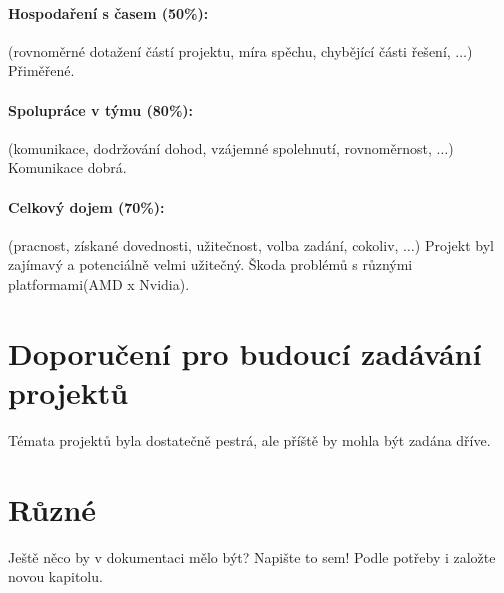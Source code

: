 \documentclass[11pt,a4paper]{article}
\begin{document}
\paragraph{Hospodaření s časem (50\%):} (rovnoměrné dotažení částí projektu,
míra spěchu, chybějící části řešení, $\ldots$)
Přiměřené. 

\paragraph{Spolupráce v týmu (80\%):} (komunikace, dodržování dohod, vzájemné
spolehnutí, rovnoměrnost, $\ldots$)
Komunikace dobrá.

\paragraph{Celkový dojem (70\%):} (pracnost, získané dovednosti, užitečnost,
volba zadání, cokoliv, $\ldots$)
Projekt byl zajímavý a potenciálně velmi užitečný. Škoda problémů s různými platformami(AMD x Nvidia).

\section{Doporučení pro budoucí zadávání projektů}

Témata projektů byla dostatečně pestrá, ale příště by mohla být zadána dříve.

\section{Různé}

Ještě něco by v dokumentaci mělo být? Napište to sem! Podle potřeby i založte
novou kapitolu.
\end{document}
